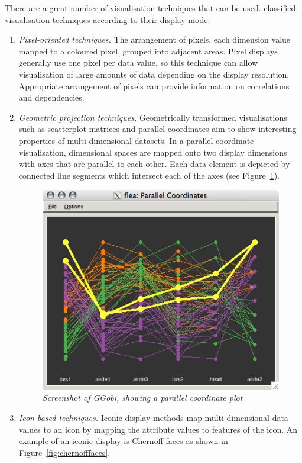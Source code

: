 There are a great number of visualisation techniques that can be used. \cite{keim96} classified visualisation techniques according to their display mode:

\begin{enumerate}
\item \emph{Pixel-oriented techniques.} The arrangement of pixels, each dimension value mapped to a coloured pixel, grouped into adjacent areas. Pixel displays generally use one pixel per data value, so this technique can allow visualisation of large amounts of data depending on the display resolution. Appropriate arrangement of pixels can provide information on correlations and dependencies.

\item  \emph{Geometric projection techniques.} Geometrically transformed visualisations such as scatterplot matrices and parallel coordinates aim to show interesting properties of multi-dimensional datasets. In a parallel coordinate visualisation, dimensional spaces are mapped onto two display dimensions with axes that are parallel to each other. Each data element is depicted by connected line segments which intersect each of the axes (see Figure~\ref{fig:parallelcoordinates}). 

\begin{figure}[!htb]
  	 \centering
   	\includegraphics[scale=0.50]{parallelcoordinates.png}
  	\caption{\emph{Screenshot of GGobi, showing a parallel coordinate plot} \citep{parallelcoodinatesurl}}
	\label{fig:parallelcoordinates}
\end{figure}

\item  \emph{Icon-based techniques.} Iconic display methods map multi-dimensional data values to an icon by mapping the attribute values to features of the icon. An example of an iconic display is Chernoff faces \citep{chernoff73} as shown in Figure~\vref{fig:chernofffaces}. 


\end{enumerate}
